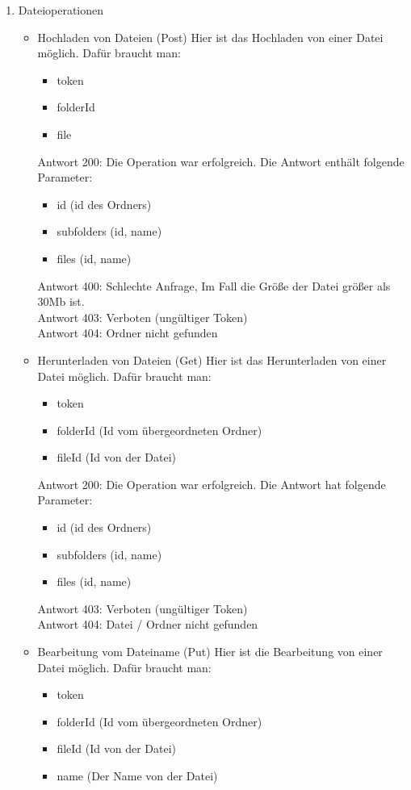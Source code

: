 \begin{enumerate}
\item Dateioperationen
\begin{itemize}
\item Hochladen von Dateien (Post)
Hier ist das Hochladen von einer Datei m\"oglich. Daf\"ur braucht man: 
\begin{itemize}
\item token
\item folderId 
\item file
\end{itemize}
Antwort 200: Die Operation war erfolgreich. Die Antwort enth\"alt folgende Parameter:
\begin{itemize}
\item id (id des Ordners)
\item subfolders (id, name)
\item files (id, name)
\end{itemize}
Antwort 400: Schlechte Anfrage, Im Fall die Gr\"o{\ss}e der Datei gr\"o{\ss}er als 30Mb ist. \\
Antwort 403: Verboten (ung\"ultiger Token) \\
Antwort 404: Ordner nicht gefunden
\item Herunterladen von Dateien (Get)
Hier ist das Herunterladen von einer Datei m\"oglich. Daf\"ur braucht man:
\begin{itemize}
\item token
\item folderId (Id vom \"ubergeordneten Ordner)
\item fileId (Id von der Datei)
\end{itemize}
Antwort 200: Die Operation war erfolgreich. Die Antwort hat folgende Parameter:
\begin{itemize}
\item id (id des Ordners)
\item subfolders (id, name)
\item files (id, name)
\end{itemize}
Antwort 403: Verboten (ung\"ultiger Token) \\
Antwort 404: Datei / Ordner nicht gefunden
\item Bearbeitung vom Dateiname (Put)
Hier ist die Bearbeitung von einer Datei m\"oglich. Daf\"ur braucht man:
\begin{itemize}
\item token
\item folderId (Id vom \"ubergeordneten Ordner)
\item fileId (Id von der Datei)
\item name (Der Name von der Datei) 
\end{itemize}


\end{itemize}
\end{enumerate}
